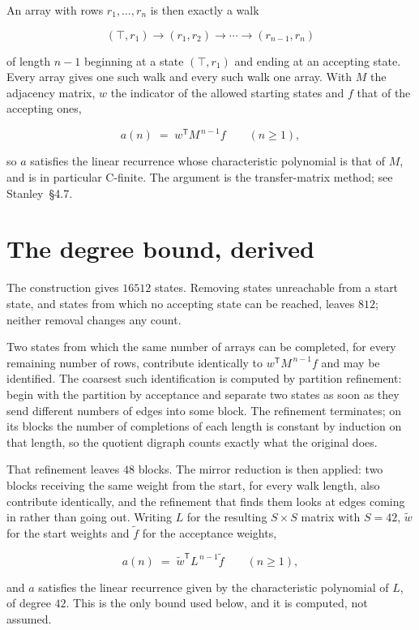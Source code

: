 \documentclass[11pt]{article}
\theoremstyle{definition}
\begin{document}
An array with rows $r_1,\dots,r_n$ is then exactly a walk

\[(\top,r_1) \to (r_1,r_2) \to \cdots \to (r_{n-1},r_n)\]

of length $n-1$ beginning at a state $(\top,r_1)$ and ending at an accepting state. Every array gives one such walk and every such walk one array. With $M$ the adjacency matrix, $w$ the indicator of the allowed starting states and $f$ that of the accepting ones,

\[a(n) \;=\; w^{\mathsf T} M^{\,n-1} f \qquad (n \ge 1),\]

so $a$ satisfies the linear recurrence whose characteristic polynomial is that of $M$, and is in particular C-finite. The argument is the transfer-matrix method; see Stanley~\S4.7.

\section{The degree bound, derived}

The construction gives $16512$ states. Removing states unreachable from a start state, and states from which no accepting state can be reached, leaves $812$; neither removal changes any count.

Two states from which the same number of arrays can be completed, for every remaining number of rows, contribute identically to $w^{\mathsf T}M^{\,n-1}f$ and may be identified. The coarsest such identification is computed by partition refinement: begin with the partition by acceptance and separate two states as soon as they send different numbers of edges into some block. The refinement terminates; on its blocks the number of completions of each length is constant by induction on that length, so the quotient digraph counts exactly what the original does.

That refinement leaves $48$ blocks. The mirror reduction is then applied: two blocks receiving the same weight from the start, for every walk length, also contribute identically, and the refinement that finds them looks at edges coming in rather than going out. Writing $L$ for the resulting $S \times S$ matrix with $S = 42$, $\tilde w$ for the start weights and $\tilde f$ for the acceptance weights,

\[a(n) \;=\; \tilde w^{\mathsf T} L^{\,n-1} \tilde f \qquad (n \ge 1),\]

and $a$ satisfies the linear recurrence given by the characteristic polynomial of $L$, of degree $42$. This is the only bound used below, and it is computed, not assumed.
\end{document}
